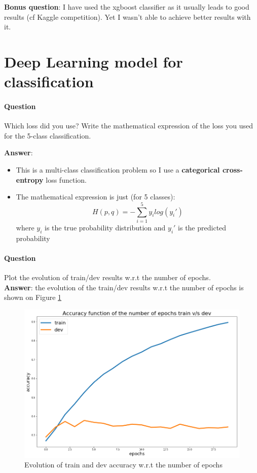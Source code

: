 \documentclass[11pt]{article}
\numberwithin{figure}{section} %
\begin{document}
\textbf{Bonus question}: I have used the xgboost classifier as it usually leads to good results (cf Kaggle competition). Yet I wasn't able to achieve better results with it.

\section{Deep Learning model for classification}
\paragraph{Question} Which loss did you use? Write the mathematical expression of
the loss you used for the 5-class classification.

\textbf{Answer}: 
\begin{itemize}
\item This is a multi-class classification problem so I use a \textbf{categorical cross-entropy} loss function.
\item The mathematical expression is just (for 5 classes):
$$H(p, q) = - \sum\limits_{i=1}^5 y_i log(y_i')$$
where $y_i$ is the true probability distribution and $y_i'$ is the predicted probability
\end{itemize}

\paragraph{Question} Plot the evolution of train/dev results w.r.t the number of epochs. \\
\textbf{Answer}: the evolution of the train/dev results w.r.t the number of epochs is shown on Figure \ref{fig:graph_epoch}

\begin{figure}[H]
		\centering
		\includegraphics[width=1\linewidth]{images/graph_acc}
		\caption{Evolution of train and dev accuracy w.r.t the number of epochs}
		\label{fig:graph_epoch}
\end{figure}
\end{document}
